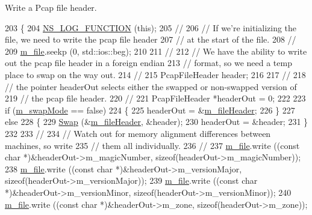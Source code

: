 Write a Pcap file header. 


\begin{DoxyCode}
203 \{
204   \hyperlink{log-macros-disabled_8h_a90b90d5bad1f39cb1b64923ea94c0761}{NS\_LOG\_FUNCTION} (\textcolor{keyword}{this});
205   \textcolor{comment}{//}
206   \textcolor{comment}{// If we're initializing the file, we need to write the pcap file header}
207   \textcolor{comment}{// at the start of the file.}
208   \textcolor{comment}{//}
209   \hyperlink{classns3_1_1PcapFile_ac8ecc2d37ff1e2a5148901e10f855c26}{m\_file}.seekp (0, std::ios::beg);
210  
211   \textcolor{comment}{//}
212   \textcolor{comment}{// We have the ability to write out the pcap file header in a foreign endian}
213   \textcolor{comment}{// format, so we need a temp place to swap on the way out.}
214   \textcolor{comment}{//}
215   PcapFileHeader header;
216 
217   \textcolor{comment}{//}
218   \textcolor{comment}{// the pointer headerOut selects either the swapped or non-swapped version of}
219   \textcolor{comment}{// the pcap file header.}
220   \textcolor{comment}{//}
221   PcapFileHeader *headerOut = 0;
222 
223   \textcolor{keywordflow}{if} (\hyperlink{classns3_1_1PcapFile_a179acfdfb216038a20ddb8cdc5fe182d}{m\_swapMode} == \textcolor{keyword}{false})
224     \{
225       headerOut = &\hyperlink{classns3_1_1PcapFile_a44261d9566e738203968f357584e268c}{m\_fileHeader};
226     \}
227   \textcolor{keywordflow}{else}
228     \{
229       \hyperlink{classns3_1_1PcapFile_af5adf22a721473f1add1e002492f5587}{Swap} (&\hyperlink{classns3_1_1PcapFile_a44261d9566e738203968f357584e268c}{m\_fileHeader}, &header);
230       headerOut = &header;
231     \}
232 
233   \textcolor{comment}{//}
234   \textcolor{comment}{// Watch out for memory alignment differences between machines, so write}
235   \textcolor{comment}{// them all individually.}
236   \textcolor{comment}{//}
237   \hyperlink{classns3_1_1PcapFile_ac8ecc2d37ff1e2a5148901e10f855c26}{m\_file}.write ((\textcolor{keyword}{const} \textcolor{keywordtype}{char} *)&headerOut->m\_magicNumber, \textcolor{keyword}{sizeof}(headerOut->m\_magicNumber));
238   \hyperlink{classns3_1_1PcapFile_ac8ecc2d37ff1e2a5148901e10f855c26}{m\_file}.write ((\textcolor{keyword}{const} \textcolor{keywordtype}{char} *)&headerOut->m\_versionMajor, \textcolor{keyword}{sizeof}(headerOut->m\_versionMajor));
239   \hyperlink{classns3_1_1PcapFile_ac8ecc2d37ff1e2a5148901e10f855c26}{m\_file}.write ((\textcolor{keyword}{const} \textcolor{keywordtype}{char} *)&headerOut->m\_versionMinor, \textcolor{keyword}{sizeof}(headerOut->m\_versionMinor));
240   \hyperlink{classns3_1_1PcapFile_ac8ecc2d37ff1e2a5148901e10f855c26}{m\_file}.write ((\textcolor{keyword}{const} \textcolor{keywordtype}{char} *)&headerOut->m\_zone, \textcolor{keyword}{sizeof}(headerOut->m\_zone));

\end{DoxyCode}
